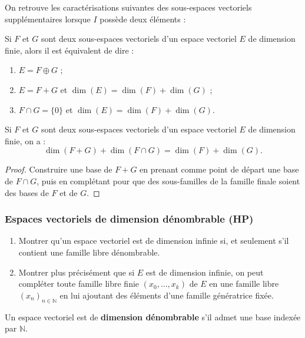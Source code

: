 \documentclass[french]{article}
\newcommand{\N}{\mathbb{N}}
\theoremstyle{plain}
\theoremstyle{definition}
\theoremstyle{remark}
\begin{document}
On retrouve les caractérisations suivantes des sous-espaces vectoriels supplémentaires lorsque $I$ possède deux éléments :

\begin{thm}%
	Si $F$ et $G$ sont deux sous-espaces vectoriels d'un espace vectoriel $E$ de dimension finie, alors il est équivalent de dire :
	\begin{enumerate}[label=(\roman*)]
		\item $E=F\oplus G$ ;
		\item $E=F+G$ et $\dim(E)=\dim(F)+\dim(G)$ ;
		\item $F\cap G=\{0\}$ et $\dim(E)=\dim(F)+\dim(G)$.
	\end{enumerate}
\end{thm}

\begin{prop}%
	Si $F$ et $G$ sont deux sous-espaces vectoriels d'un espace vectoriel $E$ de dimension finie, on a : $$\dim(F+G)+\dim(F\cap G)=\dim(F)+\dim(G).$$
\end{prop}
\begin{proof}
	Construire une base de $F+G$ en prenant comme point de départ une base de $F\cap G$, puis en complétant pour que des sous-familles de la famille finale soient des bases de $F$ et de $G$.
\end{proof}

\subsubsection*{Espaces vectoriels de dimension dénombrable (HP)}

\begin{exo}
	\begin{enumerate}
		\item Montrer qu'un espace vectoriel est de dimension infinie si, et seulement s'il contient une famille libre dénombrable.
		\item Montrer plus précisément que si $E$ est de dimension infinie, on peut compléter toute famille libre finie $(x_0,\ldots,x_k)$ de $E$ en une famille libre $(x_n)_{n\in\N}$ en lui ajoutant des éléments d'une famille génératrice fixée.
	\end{enumerate}
\end{exo}

\begin{dfn}
	Un espace vectoriel est de \textbf{dimension dénombrable} s'il admet une base indexée par $\N$.
\end{dfn}
\end{document}
